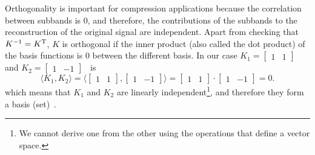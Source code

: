 Orthogonality is important for compression applications because the
correlation between subbands is 0, and therefore, the contributions of
the subbands to the reconstruction of the original signal are
independent. Apart from checking that $K^{-1}=K^{\text T}$, $K$ is
orthogonal if the inner product (also called the dot product)
of the basis functions is $0$ between the different basis. In our case $K_1=\begin{bmatrix}1 &
1\end{bmatrix}$ and $K_2=\begin{bmatrix} 1 & -1\end{bmatrix}$~ is
\begin{equation}
  \langle K_1,K_2 \rangle =
  \langle \begin{bmatrix}
    1 & 1
  \end{bmatrix}
  ,
  \begin{bmatrix}
    1 & -1
  \end{bmatrix}
  \rangle =
  \begin{bmatrix}
    1 & 1
  \end{bmatrix}
  \cdot
  \begin{bmatrix}
    1 & -1
  \end{bmatrix}
   = 0.
\end{equation}
which means that $K_1$ and $K_2$ are linearly independent\footnote{We
cannot derive one from the other using the operations that define a
vector space.}, and therefore they form a basis
(set)~\cite{strang4linear}.

